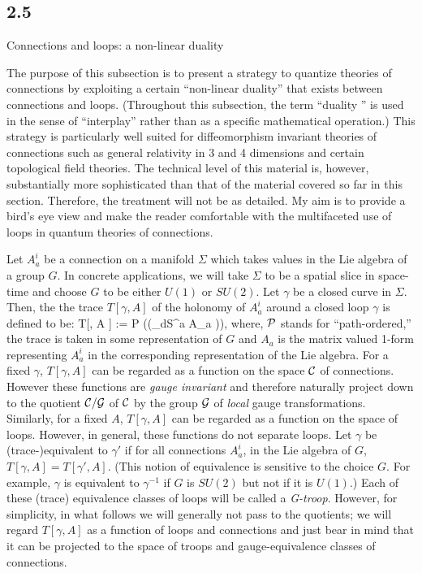 \goodbreak
\subsection{2.5}{Connections and loops: a non-linear duality}

The purpose of this subsection is to present a strategy to quantize
theories of connections by exploiting a certain ``non-linear duality'' that
exists between connections and loops. (Throughout this subsection, the
term ``duality '' is used in the sense of ``interplay'' rather than as
a specific mathematical operation.) This strategy is
particularly well suited for diffeomorphism invariant theories of connections
such as general relativity in 3 and 4 dimensions and certain topological
field theories. The technical level of this material is, however,
substantially more sophisticated than that of the material covered so
far in this section. Therefore, the treatment will not be as detailed.
My aim is to provide a bird's eye view and make the reader comfortable
with the multifaceted use of loops in quantum theories of connections.

Let $A_a^i$ be a connection on a manifold $\Sigma$ which takes values in
the Lie algebra of a group $G$. In concrete applications, we will take
$\Sigma$ to be a spatial slice in space-time and choose $G$ to be either
$U(1)$ or $SU(2)$. Let $\gamma$ be a closed curve in $\Sigma$. Then, the
the trace $T[\gamma, A]$ of the holonomy of $A_a^i$ around a closed loop
$\gamma$ is defined to be:
\bneq
T[\gamma, A ] := \tr\- {\cal P} \big(\exp (\loint_\gamma dS^a\- A_a )\big),
where, ${\cal P}$ stands for ``path-ordered,'' the trace is taken in some
representation of $G$ and $A_a$ is the matrix valued 1-form representing
$A_a^i$ in the corresponding representation of the Lie algebra. For
a fixed $\gamma$, $T[\gamma , A]$ can be regarded as a function on the
space ${\cal C}$ of connections. However these functions are {\it gauge
invariant} and therefore naturally project down to the quotient ${\cal C}/
{\cal G}$ of ${\cal C}$ by the group ${\cal G}$ of {\it local} gauge
transformations. Similarly, for a fixed $A$, $T[\gamma, A]$ can be regarded
as a function on the space of loops. However, in general, these functions
do not separate loops. Let $\gamma$ be (trace-)equivalent to $\gamma'$
if for all connections $A_a^i$, in the Lie algebra of $G$, $T[\gamma, A] =
T[\gamma', A]$. (This notion of equivalence is sensitive to the choice $G$.
For example, $\gamma$ is equivalent to $\gamma^{-1}$ if $G$ is $SU(2)$ but
not if it is $U(1)$.) Each of these (trace) equivalence classes of loops will
be called a {\it G-troop}. However, for simplicity, in what follows we will
generally not pass to the quotients; we will regard $T[\gamma, A]$ as a
function of loops and connections and just bear in mind that it can be
projected to the space of troops and gauge-equivalence classes of connections.


